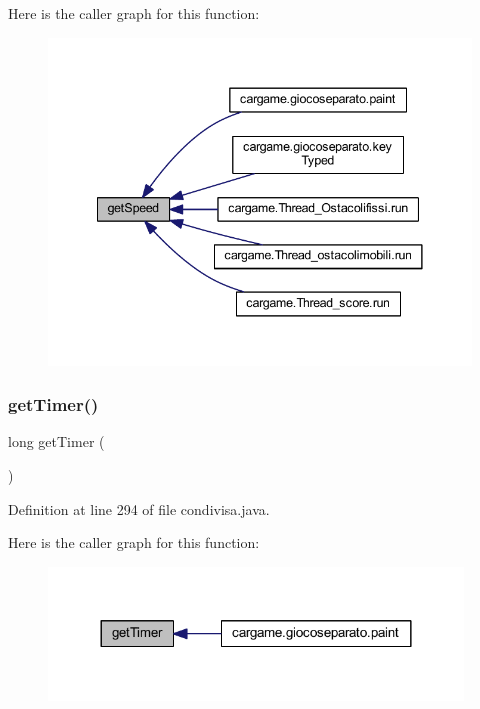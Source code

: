 Here is the caller graph for this function\+:
\nopagebreak
\begin{figure}[H]
\begin{center}
\leavevmode
\includegraphics[width=341pt]{classcargame_1_1condivisa_ae2096b3878b5e714bf1d7b9d32389a5c_icgraph}
\end{center}
\end{figure}
\mbox{\label{classcargame_1_1condivisa_a822b401425b70109c2537a534267e408}} 
\subsubsection{\texorpdfstring{get\+Timer()}{getTimer()}}
{\footnotesize\ttfamily long get\+Timer (\begin{DoxyParamCaption}{ }\end{DoxyParamCaption})}



Definition at line 294 of file condivisa.\+java.

Here is the caller graph for this function\+:
\nopagebreak
\begin{figure}[H]
\begin{center}
\leavevmode
\includegraphics[width=312pt]{classcargame_1_1condivisa_a822b401425b70109c2537a534267e408_icgraph}
\end{center}
\end{figure}
\mbox{\label{classcargame_1_1condivisa_a356433543b0604c02ccbd5517dac4353}} 
